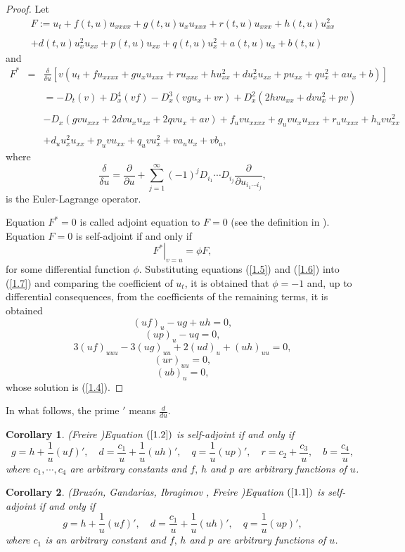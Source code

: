 \documentclass[11pt,letterpaper,twoside]{article}
\def\de{\delta}
\newcommand{\f}{\frac}
\newcommand{\ds}{\displaystyle }
\newtheorem{corollary}{Corollary}
\newcommand{\p}{\partial}
\newcommand{\bb}{\begin{equation}}
\newcommand{\ee}{\end{equation}}
\newcommand{\ba}{\begin{array}}
\newcommand{\ea}{\end{array}}
\begin{document}
\begin{proof}
Let 
\bb\label{1.5}
\ba{l}
F:=u_{t}+f(t,u)u_{xxxx}+g(t,u)u_{x}u_{xxx}+r(t,u)u_{xxx}+h(t,u)u_{xx}^{2}\\
\\
+d(t,u)u_{x}^{2}u_{xx}+p(t,u)u_{xx}+q(t,u)u_{x}^{2}+a(t,u)u_{x}+b(t,u)
\ea
\ee
and
\bb\label{1.6}
\ba{lcl}
F^{\ast}&=&\ds{\f{\de}{\de u}[v(u_{t}+fu_{xxxx}+gu_{x}u_{xxx}+ru_{xxx}+hu_{xx}^{2}+du_{x}^{2}u_{xx}+pu_{xx}+qu_{x}^{2}+au_{x}+b)]}\\
\\
&&\ds{=-D_{t}(v)+D_{x}^{4}(vf)-D_{x}^{3}(vgu_{x}+vr)+D_{x}^{2}(2hvu_{xx}+dvu_{x}^{2}+pv)}\\
\\
&&\ds{-D_{x}(gvu_{xxx}+2dvu_{x}u_{xx}+2qvu_{x}+av)+f_{u}vu_{xxxx}+g_{u}vu_{x}u_{xxx}+r_{u}u_{xxx}+h_{u}vu_{xx}^{2}}\\
\\
&&\ds{+d_{u}u_{x}^{2}u_{xx}+p_{u}vu_{xx}+q_{u}vu_{x}^{2}+va_{u}u_{x}+vb_{u},}
\ea
\ee
where 
$$
\f{\de}{\de u}=\f{\p}{\p u}+\sum_{j=1}^{\infty}(-1)^{j}D_{i_{1}}\cdots D_{i_{j}}\f{\p}{\p u_{i_{1}\cdots i_{j}}},
$$
is the Euler-Lagrange operator.

Equation $F^{\ast}=0$ is called adjoint equation to $F=0$ (see the definition in \cite{ib1,ijnmp,i1,ib2,ib3}). Equation $F=0$ is self-adjoint if and only if 
\bb\label{1.7}
\left.F^{\ast}\right|_{v=u}=\phi F,
\ee
for some differential function $\phi$. Substituting equations (\ref{1.5}) and (\ref{1.6}) into (\ref{1.7}) and comparing the coefficient of $u_{t}$, it is obtained that $\phi=-1$ and, up to differential consequences, from the coefficients of the remaining terms, it is obtained
\bb\label{1.8.1}
(uf)_{u}-ug+uh=0,
\ee
\bb\label{1.8.2}
(up)_{u}-uq=0,
\ee
\bb\label{1.8.3}
3(uf)_{uuu}-3(ug)_{uu}+2(ud)_{u}+(uh)_{uu}=0,
\ee
\bb\label{1.8.4}
(ur)_{uu}=0,
\ee
\bb\label{1.8.5}
(ub)_{u}=0,
\ee
whose solution is (\ref{1.4}).
\end{proof}

In what follows, the prime $'$ means $\f{d}{d u}$. 
\begin{corollary}(Freire \cite{i1})\label{cor1}
Equation $(\ref{1.2})$ is self-adjoint if and only if
$$
g=h+\f{1}{u}(uf)',\,\,\,\,\,\,d=\f{c_{1}}{u}+\f{1}{u}(uh)',\,\,\,\,\,\,q=\f{1}{u}(up)',\,\,\,\,\,\,r=c_{2}+\f{c_{3}}{u},\,\,\,\,\,\,b=\f{c_{4}}{u},
$$
where $c_{1},\cdots,c_{4}$ are arbitrary constants and $f,\,h$ and $p$ are arbitrary functions of $u$.
\end{corollary}

\begin{corollary}(Bruzón, Gandarias, Ibragimov \cite{ib1}, Freire \cite{i1})\label{cor2}
Equation $(\ref{1.1})$ is self-adjoint if and only if
$$
g=h+\f{1}{u}(uf)',\,\,\,\,\,\,d=\f{c_{1}}{u}+\f{1}{u}(uh)',\,\,\,\,\,\,q=\f{1}{u}(up)',
$$
where $c_{1}$ is an arbitrary constant and $f,\,h$ and $p$ are arbitrary functions of $u$.
\end{corollary}
\end{document}
